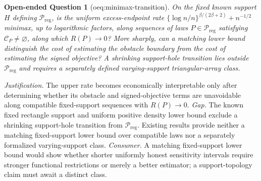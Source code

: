 \documentclass{article}
\newtheorem{openendedquestion}{Open-ended Question}
\begin{document}
\begin{openendedquestion}[oeq:minimax-transition]\label{oeq:minimax-transition}
On the fixed known support \(H\) defining \(\mathcal P_{\mathrm{reg}}\), is the uniform excess-endpoint rate \(\{\log n/n\}^{\beta/(2\beta+2)}+n^{-1/2}\) minimax, up to logarithmic factors, along sequences of laws \(P\in\mathcal P_{\mathrm{reg}}\) satisfying \(\mathcal C_P\neq\varnothing\), along which \(R(P)\to0\)? More sharply, can a matching lower bound distinguish the cost of estimating the obstacle boundary from the cost of estimating the signed objective? A shrinking support-hole transition lies outside \(\mathcal P_{\mathrm{reg}}\) and requires a separately defined varying-support triangular-array class.
\end{openendedquestion}
\par\smallskip\noindent \textit{Justification.} The upper rate becomes economically interpretable only after determining whether its obstacle and signed-objective terms are unavoidable along compatible fixed-support sequences with \(R(P)\to0\). \textit{Gap.} The known fixed rectangle support and uniform positive density lower bound exclude a shrinking support-hole transition from \(\mathcal P_{\mathrm{reg}}\). Existing results provide neither a matching fixed-support lower bound over compatible laws nor a separately formalized varying-support class. \textit{Consumer.} A matching fixed-support lower bound would show whether shorter uniformly honest sensitivity intervals require stronger functional restrictions or merely a better estimator; a support-topology claim must await a distinct class.
\end{document}
